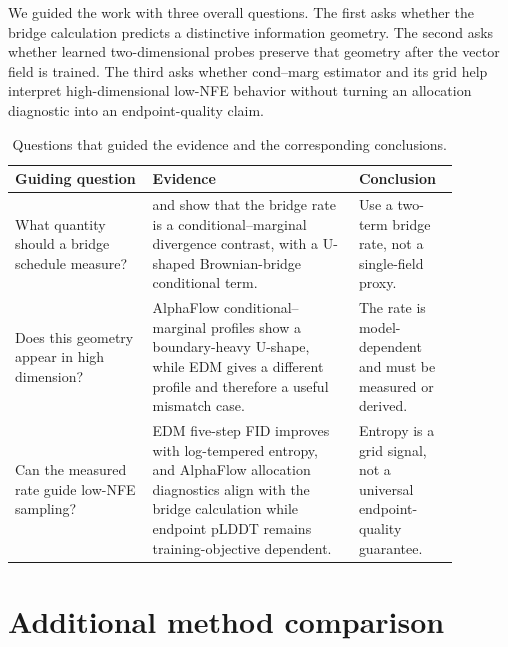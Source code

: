 \documentclass{article}
\theoremstyle{plain}
\theoremstyle{definition}
\theoremstyle{remark}
\begin{document}
We guided the work with three overall questions. The first asks whether the bridge calculation predicts a distinctive information geometry. The second asks whether learned two-dimensional probes preserve that geometry after the vector field is trained. The third asks whether cond--marg estimator and its grid help interpret high-dimensional low-NFE behavior without turning an allocation diagnostic into an endpoint-quality claim.


\begin{table}[H]
  \caption{Questions that guided the evidence and the corresponding conclusions.}
  \label{tab:hypotheses}
  \centering
  \small
  \begin{tabular}{P{0.28\linewidth}P{0.42\linewidth}P{0.18\linewidth}}
    \toprule
    Guiding question & Evidence & Conclusion \\
    \midrule
    What quantity should a bridge schedule measure? &  and  show that the bridge rate is a conditional--marginal divergence contrast, with a U-shaped Brownian-bridge conditional term. & Use a two-term bridge rate, not a single-field proxy. \\
    Does this geometry appear in high dimension? & AlphaFlow conditional--marginal profiles show a boundary-heavy U-shape, while EDM gives a different profile and therefore a useful mismatch case. & The rate is model-dependent and must be measured or derived. \\
    Can the measured rate guide low-NFE sampling? & EDM five-step FID improves with log-tempered entropy, and AlphaFlow allocation diagnostics align with the bridge calculation while endpoint pLDDT remains training-objective dependent. & Entropy is a grid signal, not a universal endpoint-quality guarantee. \\
    \bottomrule
  \end{tabular}
\end{table}


\section{Additional method comparison}
\label{app:comparison}
\end{document}

